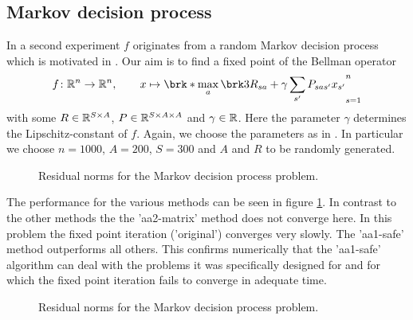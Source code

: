 %	
%

\subsection{Markov decision process}

In a second experiment $f$ originates from a random Markov decision process which is motivated in \cite[Section 5.1f]{ZhaAA}. Our aim is to find a fixed point of the Bellman operator
\begin{align*}
	f\colon\R^{n}\to\R^{n}, \qquad x\mapsto \brk*{\max_{a} \brk3{ R_{sa}+\gamma \sum_{s'}P_{sas'}x_{s'}}}_{s=1}^{n}
\end{align*}
with some $R\in\mathbb{R}^{S\times A}$, $P\in\mathbb{R}^{S\times A\times A}$ and $\gamma\in\mathbb{R}$. Here the parameter $\gamma$ determines the Lipschitz-constant of $f$. Again, we choose the parameters as in \cite[Section 5.2]{ZhaAA}. In particular we choose $n=1000$, $A=200$, $S=300$ and $A$ and $R$ to be randomly generated.

\begin{figure}
	\centering
	{\scriptsize
	
	}
	\caption{Residual norms for the Markov decision process problem.}
	\label{pl:method_comparison_VI}
\end{figure}

The performance for the various methods can be seen in figure \ref{pl:method_comparison_VI}. In contrast to the other methods the the 'aa2-matrix' method does not converge here. In this problem the fixed point iteration ('original') converges very slowly. The 'aa1-safe' method outperforms all others. This confirms numerically that the 'aa1-safe' algorithm can deal with the problems it was specifically designed for and for which the fixed point iteration fails to converge in adequate time. 

\begin{figure}
	\centering
	{\scriptsize
	
	}
	\caption{Residual norms for the Markov decision process problem.}
	\label{pl:memory_comparison_VI}
\end{figure}

